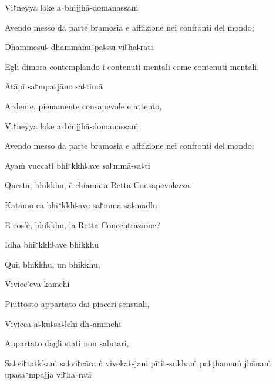 Vi꜓neyya loke a꜕bhijjhā-domanassaṁ

\begin{english}
  Avendo messo da parte bramosia e afflizione nei confronti del mondo;
\end{english}

Dhammesu꜕ dhammānu꜓pa꜕ssī vi꜓ha꜕rati

\begin{english}
  Egli dimora contemplando i contenuti mentali come contenuti mentali,
\end{english}

Ātāpī sa꜓mpa꜕jāno sa꜕timā

\begin{english}
  Ardente, pienamente consapevole e attento,
\end{english}

Vi꜓neyya loke a꜕bhijjhā-domanassaṁ

\begin{english}
  Avendo messo da parte bramosia e afflizione nei confronti del mondo:
\end{english}

Ayaṁ vuccati bhi꜓kkh꜕ave sa꜓mmā-sa꜕ti

\begin{english}
  Questa, bhikkhu, è chiamata Retta Consapevolezza.
\end{english}

\ifaivedition
\clearpage
\fi

Katamo ca bhi꜓kkh꜕ave sa꜓mmā-sa꜕mādhi

\begin{english}
  E cos'è, bhikkhu, la Retta Concentrazione?
\end{english}

Idha bhi꜓kkh꜕ave bhikkhu

\begin{english}
  Qui, bhikkhu, un bhikkhu,
\end{english}

Vivicc'eva kāmehi

\begin{english}
  Piuttosto appartato dai piaceri sensuali,
\end{english}

Vivicca a꜕ku꜕sa꜕lehi dh꜕ammehi

\begin{english}
  Appartato dagli stati non salutari,
\end{english}

Sa꜕vi꜓ta꜕kkaṁ sa꜕vi꜓cāraṁ viveka꜕-jaṁ pīti꜕-sukhaṁ pa꜕ṭhamaṁ jhānaṁ upasa꜓mpajja vi꜓ha꜕rati

